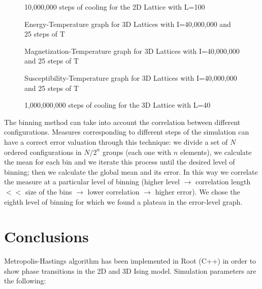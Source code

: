 \documentclass[11pt,a4paper]{article}
\begin{document}
\begin{figure}[h!]
  \centering
  
  \caption{10,000,000 steps of cooling for the 2D Lattice with L=100}
\end{figure}

\begin{figure}[h!]
  \centering
  
  \caption{Energy-Temperature graph for 3D Lattices with I=40,000,000 and 25 steps of T}
\end{figure}

\begin{figure}[h!]
  \centering
 
  \caption{Magnetization-Temperature graph for 3D Lattices with I=40,000,000 and 25 steps of T}
\end{figure}

\begin{figure}[h!]
  \centering
  
  \caption{Susceptibility-Temperature graph for 3D Lattices with I=40,000,000 and 25 steps of T}
\end{figure}

\begin{figure}[h!]
  \centering
 
  \caption{1,000,000,000 steps of cooling for the 3D Lattice with L=40}
\end{figure}



The binning method can take into account the correlation between different configurations. Measures corresponding to different steps of the simulation can have a correct error valuation through this technique: we divide a set of $N$ ordered configurations in $N/2^n$ groups (each one with $n$ elements), we calculate the mean for each bin and we iterate this process until the desired level of binning; then we calculate the global mean and its error. In this way we correlate the measure at a particular level of binning (higher level $\rightarrow$ correlation length $<<$ size of the bins $\rightarrow$ lower correlation $\rightarrow$ higher error). We chose the eighth level of binning for which we found a plateau in the error-level graph. 

\newpage
\section{Conclusions}
Metropolis-Hastings algorithm has been implemented in Root (C++) in order to show phase transitions in the 2D and 3D Ising model. Simulation parameters are the following:
\end{document}
